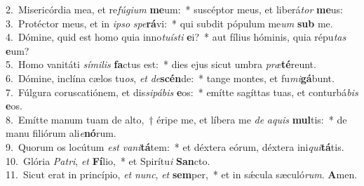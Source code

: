 {2.~}Misericórdia mea, et re\textit{fú}\textit{gi}\textit{um} \textbf{me}um:~* suscéptor meus, et liberá\textit{tor} \textbf{me}us:\\
{3.~}Protéctor meus, et in \textit{i}\textit{pso} \textit{spe}\textbf{rá}vi:~* qui subdit pópulum me\textit{um} \textbf{sub} me.\\
{4.~}Dómine, quid est homo quia inno\textit{tu}\textit{í}\textit{sti} \textbf{e}i?~* aut fílius hóminis, quia répu\textit{tas} \textbf{e}um?\\
{5.~}Homo vanitáti \textit{sí}\textit{mi}\textit{lis} \textbf{fa}ctus est:~* dies ejus sicut umbra \textit{præ}\textbf{té}reunt.\\
{6.~}Dómine, inclína cælos tu\textit{os}, \textit{et} \textit{de}\textbf{scén}de:~* tange montes, et fu\textit{mi}\textbf{gá}bunt.\\
{7.~}Fúlgura coruscatiónem, et dis\textit{si}\textit{pá}\textit{bis} \textbf{e}os:~* emítte sagíttas tuas, et conturbá\textit{bis} \textbf{e}os.\\
{8.~}Emítte manum tuam de alto,~† éripe me, et líbera me \textit{de} \textit{a}\textit{quis} \textbf{mul}tis:~* de manu filiórum ali\textit{e}\textbf{nó}rum.\\
{9.~}Quorum os locútum \textit{est} \textit{va}\textit{ni}\textbf{tá}tem:~* et déxtera eórum, déxtera ini\textit{qui}\textbf{tá}tis.\\
{10.~}Glória \textit{Pa}\textit{tri}, \textit{et} \textbf{Fí}lio,~* et Spirítu\textit{i} \textbf{San}cto.\\
{11.~}Sicut erat in princípio, \textit{et} \textit{nunc}, \textit{et} \textbf{sem}per,~* et in sǽcula sæculó\textit{rum}. \textbf{A}men.\\
